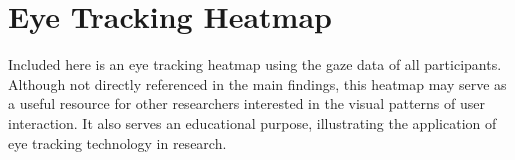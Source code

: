 \documentclass[
  a4paper,  %
  twoside,  %
  bibliography=totoc,
  headsepline,
  cleardoublepage=empty,
  parskip=half,
  draft=false
]{scrbook}
\begin{document}
\newpage
\section{Eye Tracking Heatmap}

Included here is an eye tracking heatmap using the gaze data of all participants. Although not directly referenced in the main findings, this heatmap may serve as a useful resource for other researchers interested in the visual patterns of user interaction. It also serves an educational purpose, illustrating the application of eye tracking technology in research.
\end{document}

